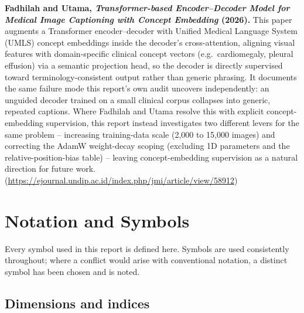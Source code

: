 \documentclass[12pt]{article}
\begin{document}
\textbf{Fadhilah and Utama, \emph{Transformer-based Encoder--Decoder Model for Medical Image Captioning with Concept Embedding} (2026).} This paper augments a Transformer encoder--decoder with Unified Medical Language System (UMLS) concept embeddings inside the decoder's cross-attention, aligning visual features with domain-specific clinical concept vectors (e.g.\ cardiomegaly, pleural effusion) via a semantic projection head, so the decoder is directly supervised toward terminology-consistent output rather than generic phrasing. It documents the same failure mode this report's own audit uncovers independently: an unguided decoder trained on a small clinical corpus collapses into generic, repeated captions. Where Fadhilah and Utama resolve this with explicit concept-embedding supervision, this report instead investigates two different levers for the same problem -- increasing training-data scale (2,000 to 15,000 images) and correcting the AdamW weight-decay scoping (excluding 1D parameters and the relative-position-bias table) -- leaving concept-embedding supervision as a natural direction for future work. (\url{https://ejournal.undip.ac.id/index.php/jmi/article/view/58912})

\section{Notation and Symbols}

Every symbol used in this report is defined here. Symbols are used consistently throughout; where a conflict would arise with conventional notation, a distinct symbol has been chosen and is noted.

\subsection{Dimensions and indices}
\end{document}
